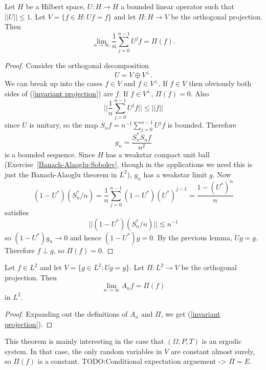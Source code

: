 \begin{lemma}
Let $H$ be a Hilbert space, $U: H \to H$ a bounded linear operator such that $||U|| \leq 1$.
Let $V = \{f \in H: Uf = f\}$ and let $\Pi: H \to V$ be the orthogonal projection. Then
\begin{equation}\label{invariant projection}
\lim_{n \to \infty} \frac{1}{n} \sum_{j=0}^{n-1} U^{j}f = \Pi(f).
\end{equation}
\end{lemma}
\begin{proof}
Consider the orthogonal decomposition
\[U = V \oplus V^{\perp}.\]
We can break up into the cases $f \in V$ and $f \in V^{\perp}$.
If $f \in V$ then obviously both sides of (\ref{invariant projection}) are $f$.
If $f \in V^{\perp}$, $\Pi(f) = 0$.
Also
\[||\frac{1}{n} \sum_{j=0}^{n-1} U^{j}f|| \leq ||f||\]
since $U$ is unitary, so the map $S_{n}f = n^{-1} \sum_{j=0}^{n-1} U^{j}f$ is bounded.
Therefore
\[g_{n} = \frac{S_{n}^{*}S_{n}f}{n^{2}}\]
is a bounded sequence. Since $H$ has a weakstar compact unit ball (Exercise~\ref{Banach-Alaoglu-Sobolev}, though in the applications we need this is just the Banach-Alaoglu theorem in $L^{2}$), $g_{n}$ has a weakstar limit $g$.
Now
\[(1 - U^{*})(S_{n}^{*}/n) = \frac{1}{n} \sum_{j=0}^{n-1} (1 - U^{*}){(U^{*})}^{j-1} = \frac{1 - {(U^{*})}^{n}}{n}\]
satisfies
\[||(1 - U^{*})(S_{n}^{*}/n)|| \lesssim n^{-1}\]
so $(1 - U^{*})g_{n} \to 0$ and hence $(1 - U^{*})g = 0$.
By the previous lemma, $Ug = g$. Therefore $f \perp g$, so $\Pi(f) = 0$.
\end{proof}

\begin{theorem}
Let $f \in L^{2}$ and let $V = \{g \in L^{2}: Ug = g\}$.
Let $\Pi: L^{2} \to V$ be the orthogonal projection.
Then
\[\lim_{n \to \infty} A_{n}f = \Pi(f)\]
in $L^{2}$.
\end{theorem}
\begin{proof}
Expanding out the definitions of $A_{n}$ and $\Pi$, we get (\ref{invariant projection}).
\end{proof}

This theorem is mainly interesting in the case that $(\Omega, P, T)$ is an ergodic system.
In that case, the only random variables in $V$ are constant almost surely, so $\Pi(f)$ is a constant.
TODO:\@ Conditional expectation arguement -> $\Pi = E$.
